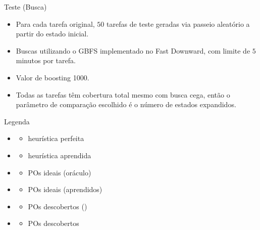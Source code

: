 \documentclass{beamer}
\begin{document}
\begin{frame}{Teste (Busca)}
\begin{itemize}
  \item Para cada tarefa original, \alert{$50$ tarefas de teste} geradas via passeio aleatório a partir do estado inicial.
  \pause
  \item Buscas utilizando o GBFS implementado no Fast Downward, com limite de \alert{$5$ minutos} por tarefa.
  \pause
  \item Valor de \alert{boosting 1000}.
  \pause
  \item Todas as tarefas têm cobertura total mesmo com busca cega, então o parâmetro de comparação escolhido é o \alert{número de estados expandidos}.
\end{itemize}
\end{frame}

\begin{frame}{Legenda}
\begin{multicols}{2}
\begin{itemize}
  \item \hstar
    \begin{itemize}
      \item heurística perfeita
    \end{itemize}
  \item \hnn
    \begin{itemize}
      \item heurística aprendida
    \end{itemize}
  \item \postartable
    \begin{itemize}
      \item POs ideais (oráculo)
    \end{itemize}
  \item \postar
    \begin{itemize}
      \item POs ideais (aprendidos)
    \end{itemize}
  \item \pogstar
    \begin{itemize}
      \item POs descobertos (\hstar)
    \end{itemize}
  \item \alert{\pog}
    \begin{itemize}
      \item POs descobertos
    \end{itemize}

\end{itemize}
\end{multicols}
\end{frame}
\end{document}
